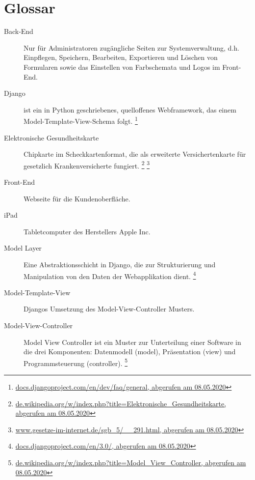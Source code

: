 \section{Glossar}

\begin{description}
  \item[Back-End]
    Nur für Administratoren zugängliche Seiten zur Systemverwaltung, d.h. Einpflegen, Speichern, Bearbeiten, Exportieren und Löschen von Formularen sowie das Einstellen von Farbschemata und Logos im Front-End.
 
  \item[Django]
    ist ein in Python geschriebenes, quelloffenes Webframework, das einem Model-Template-View-Schema folgt.
    \footnote{\href{https://docs.djangoproject.com/en/dev/faq/general}{docs.djangoproject.com/en/dev/faq/general, abgerufen am 08.05.2020}}

   \item[Elektronische Gesundheitskarte]
    Chipkarte im Scheckkartenformat, die als erweiterte Versichertenkarte für gesetzlich Krankenversicherte fungiert.
    \footnote{\href{https://de.wikipedia.org/w/index.php?title=Elektronische_Gesundheitskarte&oldid=198562236}{de.wikipedia.org/w/index.php?title=Elektronische\_Gesundheitskarte,  abgerufen am 08.05.2020}}
    \footnote{\href{https://www.gesetze-im-internet.de/sgb_5/__291.html}{www.gesetze-im-internet.de/sgb\_5/\_\_291.html, abgerufen am 08.05.2020}}
 
  \item[Front-End]
    Webseite für die Kundenoberfläche.

  \item[iPad]
    Tabletcomputer des Herstellers Apple Inc.

  \item[Model Layer]
    Eine Abstraktionsschicht in Django, die zur Strukturierung und Manipulation von den Daten der Webapplikation dient.
    \footnote{\href{https://docs.djangoproject.com/en/3.0/}{docs.djangoproject.com/en/3.0/, abgerufen am 08.05.2020}}
 
  \item[Model-Template-View]
    Djangos Umsetzung des Model-View-Controller Musters.

  \item[Model-View-Controller]
    Model View Controller ist ein Muster zur Unterteilung einer Software in die drei Komponenten: Datenmodell (model), Präsentation (view) und Programmsteuerung (controller).
    \footnote{\href{https://de.wikipedia.org/w/index.php?title=Model_View_Controller&oldid=195305891}{de.wikipedia.org/w/index.php?title=Model\_View\_Controller, abgerufen am 08.05.2020}}
    

\end{description}
